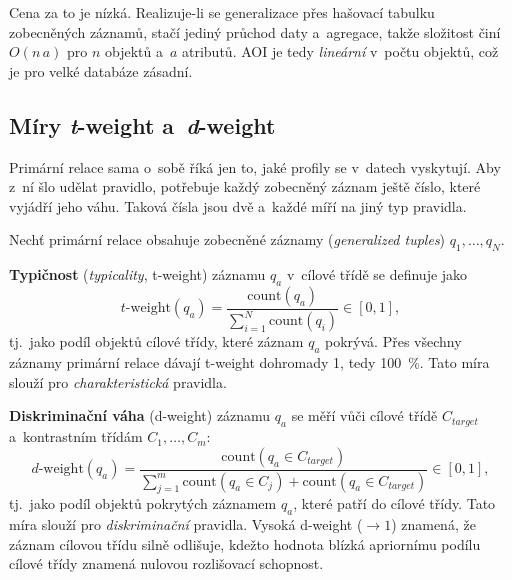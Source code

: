 \documentclass[11pt,a4paper]{article}
\theoremstyle{definition}
\begin{document}
Cena za to je nízká. Realizuje-li se generalizace přes hašovací tabulku zobecněných záznamů,
stačí jediný průchod daty a~agregace, takže složitost činí $O(n\,a)$ pro $n$ objektů a~$a$
atributů. AOI je tedy \emph{lineární} v~počtu objektů, což je pro velké databáze zásadní.

\subsection{Míry \emph{t}-weight a~\emph{d}-weight}

Primární relace sama o~sobě říká jen to, jaké profily se v~datech vyskytují. Aby z~ní šlo
udělat pravidlo, potřebuje každý zobecněný záznam ještě číslo, které vyjádří jeho váhu.
Taková čísla jsou dvě a~každé míří na jiný typ pravidla.

\begin{defbox}
Nechť primární relace obsahuje zobecněné záznamy (\emph{generalized tuples}) $q_1,\dots,q_N$.

\textbf{Typičnost} (\emph{typicality}, t-weight) záznamu $q_a$ v~cílové třídě se definuje jako
\[ t\text{-}\mathrm{weight}(q_a)=\frac{\mathrm{count}(q_a)}{\sum_{i=1}^{N}\mathrm{count}(q_i)}
   \in[0,1], \]
tj.\ jako podíl objektů cílové třídy, které záznam $q_a$ pokrývá. Přes všechny záznamy
primární relace dávají t-weight dohromady 1, tedy 100~\%. Tato míra slouží pro
\emph{charakteristická} pravidla.

\textbf{Diskriminační váha} (d-weight) záznamu $q_a$ se měří vůči cílové třídě $C_{target}$
a~kontrastním třídám $C_1,\dots,C_m$:
\[ d\text{-}\mathrm{weight}(q_a)=\frac{\mathrm{count}(q_a\in C_{target})}
   {\sum_{j=1}^{m}\mathrm{count}(q_a\in C_j)+\mathrm{count}(q_a\in C_{target})}\in[0,1], \]
tj.\ jako podíl objektů pokrytých záznamem $q_a$, které patří do cílové třídy. Tato míra
slouží pro \emph{diskriminační} pravidla. Vysoká d-weight ($\to 1$) znamená, že záznam cílovou
třídu silně odlišuje, kdežto hodnota blízká apriornímu podílu cílové třídy znamená nulovou
rozlišovací schopnost.
\end{defbox}
\end{document}
